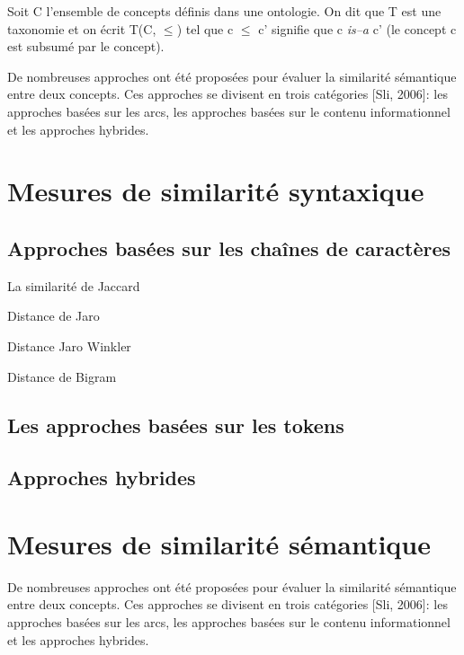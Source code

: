 \begin{mydef}
  Soit C l'ensemble de concepts définis dans une ontologie. On dit que
  T est une taxonomie et on écrit T(C, $\leq$) tel que c $\leq$ c'
  signifie que c \textit{is–a} c' (le concept c est subsumé par le
  concept).
\end{mydef}

De nombreuses approches ont été proposées pour évaluer la similarité
sémantique entre deux concepts. Ces approches se divisent en trois
catégories [Sli, 2006]: les approches basées sur les arcs, les
approches basées sur le contenu informationnel et les approches
hybrides.

\section{Mesures de similarité syntaxique}
\label{sec:syntactic-sim}

  \subsection{Approches basées sur les chaînes de caractères}
  \label{sec:syntactic-sim:string}

  La similarité de Jaccard

  Distance de Jaro

  Distance Jaro Winkler

  Distance de Bigram

  \subsection{Les approches basées sur les tokens}
  \label{sec:syntactic-sim:tokens}

  \subsection{Approches hybrides}
  \label{sec:syntactic-sim:hybrides}

\section{Mesures de similarité sémantique}
\label{sec:semantic-sim}

De nombreuses approches ont été proposées pour évaluer la similarité
sémantique entre deux concepts. Ces approches se divisent en trois
catégories [Sli, 2006]: les approches basées sur les arcs, les
approches basées sur le contenu informationnel et les approches
hybrides.

